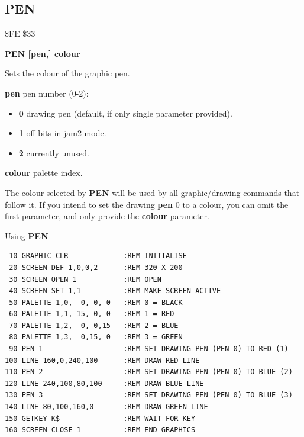 \subsection{PEN}
\begin{description}[leftmargin=2cm,style=nextline]
\item [Token:] \$FE \$33
\item [Format:] {\bf PEN [pen,] colour}
\item [Usage:]  Sets the colour of the graphic pen.

                {\bf pen} pen number (0-2):
                \begin{itemize}
                    \item {\bf 0} drawing pen (default, if only single parameter provided).
                    \item {\bf 1} off bits in jam2 mode.
                    \item {\bf 2} currently unused.
                \end{itemize}

                {\bf colour} palette index.

\item [Remarks:] The colour selected by {\bf PEN} will be used by all
                 graphic/drawing commands that follow it.
                 If you intend to set the drawing {\bf pen} 0 to a colour, you can
                 omit the first parameter, and only provide the {\bf colour} parameter.

\item [Example:] Using {\bf PEN}

\begin{tcolorbox}[colback=black,coltext=white]
\verbatimfont{\codefont}
\begin{verbatim}
 10 GRAPHIC CLR             :REM INITIALISE
 20 SCREEN DEF 1,0,0,2      :REM 320 X 200
 30 SCREEN OPEN 1           :REM OPEN
 40 SCREEN SET 1,1          :REM MAKE SCREEN ACTIVE
 50 PALETTE 1,0,  0, 0, 0   :REM 0 = BLACK
 60 PALETTE 1,1, 15, 0, 0   :REM 1 = RED
 70 PALETTE 1,2,  0, 0,15   :REM 2 = BLUE
 80 PALETTE 1,3,  0,15, 0   :REM 3 = GREEN
 90 PEN 1                   :REM SET DRAWING PEN (PEN 0) TO RED (1)
100 LINE 160,0,240,100      :REM DRAW RED LINE
110 PEN 2                   :REM SET DRAWING PEN (PEN 0) TO BLUE (2)
120 LINE 240,100,80,100     :REM DRAW BLUE LINE
130 PEN 3                   :REM SET DRAWING PEN (PEN 0) TO BLUE (3)
140 LINE 80,100,160,0       :REM DRAW GREEN LINE
150 GETKEY K$               :REM WAIT FOR KEY
160 SCREEN CLOSE 1          :REM END GRAPHICS
\end{verbatim}
\end{tcolorbox}
\end{description}



